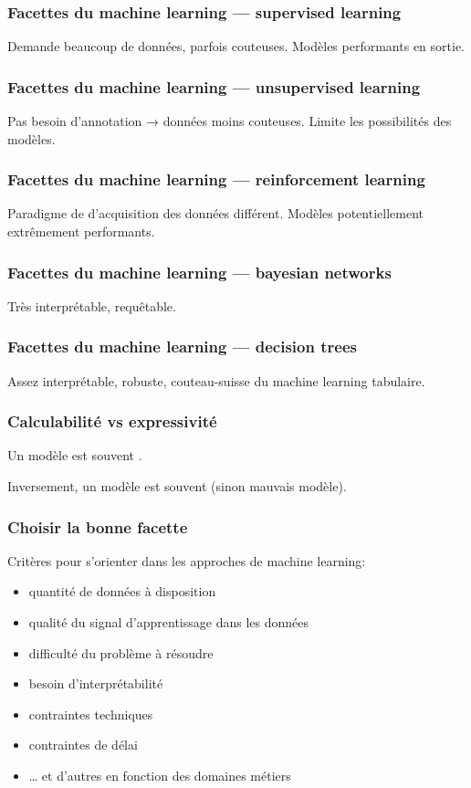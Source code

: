 \documentclass{formation}
\begin{document}
\begin{frame}
  \frametitle{Facettes du machine learning — supervised learning}
  Demande beaucoup de données, parfois couteuses. Modèles performants
  en sortie.
\end{frame}

\begin{frame}
  \frametitle{Facettes du machine learning — unsupervised learning}
  Pas besoin d'annotation → données moins couteuses. Limite les
  possibilités des modèles.
\end{frame}

\begin{frame}
  \frametitle{Facettes du machine learning — reinforcement learning}
   Paradigme de d'acquisition des données
  différent. Modèles potentiellement extrêmement performants.
\end{frame}

\begin{frame}
  \frametitle{Facettes du machine learning — bayesian networks}
  Très interprétable, requêtable.
\end{frame}

\begin{frame}
  \frametitle{Facettes du machine learning — decision trees}
   Assez interprétable, robuste, couteau-suisse
  du machine learning tabulaire.
\end{frame}

\begin{frame}
  \frametitle{Calculabilité vs expressivité}

  Un modèle  est souvent .

  Inversement, un modèle  est souvent
   (sinon mauvais modèle).
\end{frame}

\begin{frame}
  \frametitle{Choisir la bonne facette}
  Critères pour s'orienter dans les approches de machine learning:
  \begin{itemize}[<+->]
  \item quantité de données à disposition
  \item qualité du signal d'apprentissage dans les données
  \item difficulté du problème à résoudre
  \item besoin d'interprétabilité
  \item contraintes techniques
  \item contraintes de délai
  \item … et d'autres en fonction des domaines métiers
  \end{itemize}
\end{frame}
\end{document}
